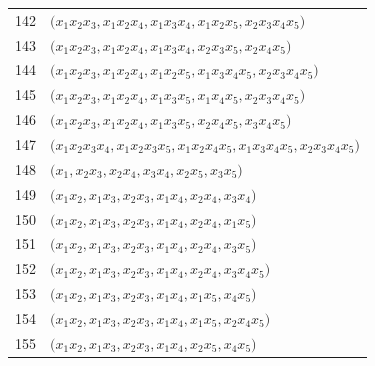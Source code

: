 {\begin{longtable}{@{}r>{\raggedright\arraybackslash}p{}@{}}
142 & \(\bigl(x_{1}x_{2}x_{3},\allowbreak x_{1}x_{2}x_{4},\allowbreak x_{1}x_{3}x_{4},\allowbreak x_{1}x_{2}x_{5},\allowbreak x_{2}x_{3}x_{4}x_{5}\bigr)\) \\
143 & \(\bigl(x_{1}x_{2}x_{3},\allowbreak x_{1}x_{2}x_{4},\allowbreak x_{1}x_{3}x_{4},\allowbreak x_{2}x_{3}x_{5},\allowbreak x_{2}x_{4}x_{5}\bigr)\) \\
144 & \(\bigl(x_{1}x_{2}x_{3},\allowbreak x_{1}x_{2}x_{4},\allowbreak x_{1}x_{2}x_{5},\allowbreak x_{1}x_{3}x_{4}x_{5},\allowbreak x_{2}x_{3}x_{4}x_{5}\bigr)\) \\
145 & \(\bigl(x_{1}x_{2}x_{3},\allowbreak x_{1}x_{2}x_{4},\allowbreak x_{1}x_{3}x_{5},\allowbreak x_{1}x_{4}x_{5},\allowbreak x_{2}x_{3}x_{4}x_{5}\bigr)\) \\
146 & \(\bigl(x_{1}x_{2}x_{3},\allowbreak x_{1}x_{2}x_{4},\allowbreak x_{1}x_{3}x_{5},\allowbreak x_{2}x_{4}x_{5},\allowbreak x_{3}x_{4}x_{5}\bigr)\) \\
147 & \(\bigl(x_{1}x_{2}x_{3}x_{4},\allowbreak x_{1}x_{2}x_{3}x_{5},\allowbreak x_{1}x_{2}x_{4}x_{5},\allowbreak x_{1}x_{3}x_{4}x_{5},\allowbreak x_{2}x_{3}x_{4}x_{5}\bigr)\) \\
148 & \(\bigl(x_{1},\allowbreak x_{2}x_{3},\allowbreak x_{2}x_{4},\allowbreak x_{3}x_{4},\allowbreak x_{2}x_{5},\allowbreak x_{3}x_{5}\bigr)\) \\
149 & \(\bigl(x_{1}x_{2},\allowbreak x_{1}x_{3},\allowbreak x_{2}x_{3},\allowbreak x_{1}x_{4},\allowbreak x_{2}x_{4},\allowbreak x_{3}x_{4}\bigr)\) \\
150 & \(\bigl(x_{1}x_{2},\allowbreak x_{1}x_{3},\allowbreak x_{2}x_{3},\allowbreak x_{1}x_{4},\allowbreak x_{2}x_{4},\allowbreak x_{1}x_{5}\bigr)\) \\
151 & \(\bigl(x_{1}x_{2},\allowbreak x_{1}x_{3},\allowbreak x_{2}x_{3},\allowbreak x_{1}x_{4},\allowbreak x_{2}x_{4},\allowbreak x_{3}x_{5}\bigr)\) \\
152 & \(\bigl(x_{1}x_{2},\allowbreak x_{1}x_{3},\allowbreak x_{2}x_{3},\allowbreak x_{1}x_{4},\allowbreak x_{2}x_{4},\allowbreak x_{3}x_{4}x_{5}\bigr)\) \\
153 & \(\bigl(x_{1}x_{2},\allowbreak x_{1}x_{3},\allowbreak x_{2}x_{3},\allowbreak x_{1}x_{4},\allowbreak x_{1}x_{5},\allowbreak x_{4}x_{5}\bigr)\) \\
154 & \(\bigl(x_{1}x_{2},\allowbreak x_{1}x_{3},\allowbreak x_{2}x_{3},\allowbreak x_{1}x_{4},\allowbreak x_{1}x_{5},\allowbreak x_{2}x_{4}x_{5}\bigr)\) \\
155 & \(\bigl(x_{1}x_{2},\allowbreak x_{1}x_{3},\allowbreak x_{2}x_{3},\allowbreak x_{1}x_{4},\allowbreak x_{2}x_{5},\allowbreak x_{4}x_{5}\bigr)\) \\

\end{longtable}}
